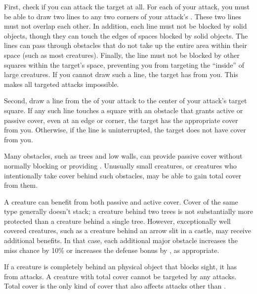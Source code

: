             First, check if you can attack the target at all.
            For each  of your attack, you must be able to draw two lines to any two corners of your attack's .
            These two lines must not overlap each other.
            In addition, each line must not be blocked by solid objects, though they can touch the edges of spaces blocked by solid objects.
            The lines can pass through obstacles that do not take up the entire area within their space (such as most creatures).
            Finally, the line must not be blocked by other squares within the target's space, preventing you from targeting the ``inside'' of large creatures.
            If you cannot draw such a line, the target has  from you.
            This makes all targeted attacks impossible.

            Second, draw a line from the  of your attack to the center of your attack's target square.
            If any such line touches a square with an obstacle that grants active or passive cover, even at an edge or corner, the target has the appropriate cover from you.
            Otherwise, if the line is uninterrupted, the target does not have cover from you.

             Many obstacles, such as trees and low walls, can provide passive cover without normally blocking  or providing .
            Unusually small creatures, or creatures who intentionally take cover behind such obstacles, may be able to gain total cover from them.

            A creature can benefit from both passive and active cover.
            Cover of the same type generally doesn't stack; a creature behind two trees is not substantially more protected than a creature behind a single tree.
            However, exceptionally well covered creatures, such as a creature behind an arrow slit in a castle, may receive additional benefits.
            In that case, each additional major obstacle increases the miss chance by 10\% or increases the defense bonus by , as appropriate.

            \label{Total Cover}
            If a creature is completely behind an physical object that blocks sight, it has  from attacks.
            A creature with total cover cannot be targeted by any attacks.
            Total cover is the only kind of cover that also affects attacks other than .

